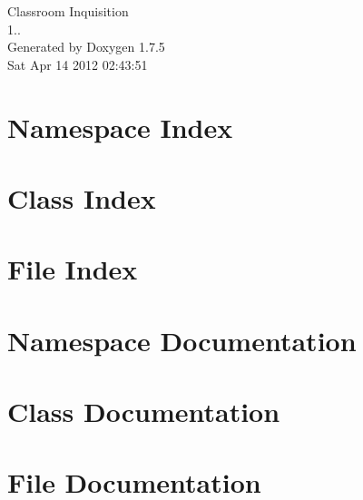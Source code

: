 \documentclass[a4paper]{book}
\begin{document}
\hypersetup{pageanchor=false,citecolor=blue}
\begin{titlepage}
\vspace*{7cm}
\begin{center}
{\Large \-Classroom \-Inquisition \\[1ex]\large 1.. }\\
\vspace*{1cm}
{\large \-Generated by Doxygen 1.7.5}\\
\vspace*{0.5cm}
{\small Sat Apr 14 2012 02:43:51}\\
\end{center}
\end{titlepage}
\clearemptydoublepage
{}
\tableofcontents
\clearemptydoublepage
{}
\hypersetup{pageanchor=true,citecolor=blue}
\chapter{\-Namespace \-Index}

\chapter{\-Class \-Index}

\chapter{\-File \-Index}

\chapter{\-Namespace \-Documentation}


\chapter{\-Class \-Documentation}






\chapter{\-File \-Documentation}
























\printindex
\end{document}
